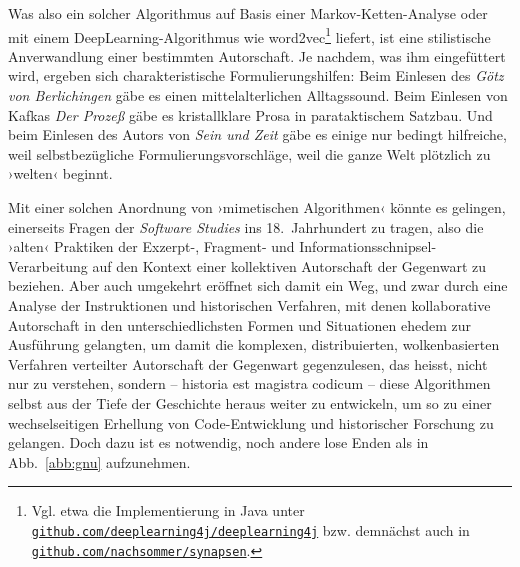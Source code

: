 \documentclass[a4paper,11pt]{article}
\newcommand{\inanf}[1]{›#1‹}
\begin{document}
Was also ein solcher Algorithmus auf Basis einer Markov-Ketten-Analyse oder mit einem DeepLearning-Algorithmus wie word2vec\footnote{Vgl. etwa die Implementierung in Java unter \href{https://github.com/deeplearning4j/deeplearning4j}{\texttt{github.com/deeplearning4j/deeplearning4j}} bzw. demnächst auch in \href{https://github.com/nachsommer/synapsen}{\texttt{github.com/nachsommer/synapsen}}.} liefert, ist eine stilistische Anverwandlung einer bestimmten Autorschaft. Je nachdem, was ihm eingefüttert wird, ergeben sich charakteristische Formulierungshilfen: Beim Einlesen des \emph{Götz von Berlichingen} gäbe es einen mittelalterlichen Alltagssound. Beim Einlesen von Kafkas \emph{Der Prozeß} gäbe es kristallklare Prosa in parataktischem Satzbau. Und beim Einlesen des Autors von \emph{Sein und Zeit} gäbe es einige nur bedingt hilfreiche, weil selbstbezügliche Formulierungsvorschläge, weil die ganze Welt plötzlich zu \inanf{welten} beginnt.

Mit einer solchen Anordnung von \inanf{mimetischen Algorithmen} könnte es  gelingen, einerseits Fragen der \emph{Software Studies} ins 18.~Jahrhundert zu tragen, also die \inanf{alten} Praktiken der Exzerpt-, Fragment- und Informationsschnipsel-Verarbeitung auf den Kontext einer kollektiven Autorschaft der Gegenwart zu beziehen. Aber auch umgekehrt eröffnet sich damit ein Weg, und zwar durch eine Analyse der Instruktionen und historischen Verfahren, mit denen kollaborative Autorschaft in den unterschiedlichsten Formen und Situationen ehedem zur Ausführung gelangten, um damit die komplexen, distribuierten, wolkenbasierten Verfahren verteilter Autorschaft der Gegenwart gegenzulesen, das heisst, nicht nur zu verstehen, sondern – historia est magistra codicum – diese Algorithmen selbst aus der Tiefe der Geschichte heraus weiter zu entwickeln, um so zu einer wechselseitigen Erhellung von Code-Entwicklung und historischer Forschung zu gelangen. Doch dazu ist es notwendig, noch andere lose Enden als in Abb.~\ref{abb:gnu} aufzunehmen.


\begin{comment}

mit besonderem Fokus auf Versionierungssystemen (mercurial, github, subversion), wie sie in der Informatik und bei global ausgelegten OpenSource-Code-Entwicklungen zum Einsatz kommen, zu untersuchen.

Man könnte beispielsweise im Detail untersuchen, wie sich die einzelnen Tätigkeiten und Prozessabläufe bei einer historisch-kritischen Edition, die einzelnen Entscheidungen, 
Die Forschung an den Merge-Algorithmen vergleichen mit der Arbeit an.

Hier ist auch die systematische Stelle, wo Fehler korrigiert werden. Es ist eine Art aufklärerisches, lektorierendes Korrektorat. 

Neue persona

Pseudo-Random!

\end{comment}

\nocite{leeuw:1999}

\printbibliography


\end{document}
